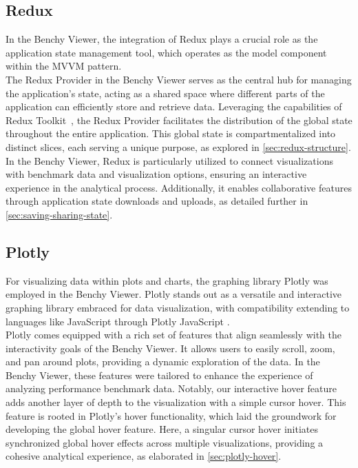\subsection{Redux}\label{sec:redux}

In the Benchy Viewer, the integration of Redux \parencite*{Redux} plays a crucial role as the application state management tool, which operates as the model component within the MVVM pattern.\\ 
The Redux Provider in the Benchy Viewer serves as the central hub for managing the application's state, acting as a shared space where different parts of the application can efficiently store and retrieve data. Leveraging the capabilities of Redux Toolkit~\parencite{redux-toolkit}, the Redux Provider facilitates the distribution of the global state throughout the entire application. This global state is compartmentalized into distinct slices, each serving a unique purpose, as explored in \ref{sec:redux-structure}.\\
In the Benchy Viewer, Redux is particularly utilized to connect visualizations with benchmark data and visualization options, ensuring an interactive experience in the analytical process. Additionally, it enables collaborative features through application state downloads and uploads, as detailed further in \ref*{sec:saving-sharing-state}.

\subsection{Plotly}

For visualizing data within plots and charts, the graphing library Plotly \parencite{plotly} was employed in the Benchy Viewer. Plotly stands out as a versatile and interactive graphing library embraced for data visualization, with compatibility extending to languages like JavaScript through Plotly JavaScript \parencite{plotly-js}.\\
Plotly comes equipped with a rich set of features that align seamlessly with the interactivity goals of the Benchy Viewer. It allows users to easily scroll, zoom, and pan around plots, providing a dynamic exploration of the data. In the Benchy Viewer, these features were tailored to enhance the experience of analyzing performance benchmark data. Notably, our interactive hover feature adds another layer of depth to the visualization with a simple cursor hover. This feature is rooted in Plotly's hover functionality, which laid the groundwork for developing the global hover feature. Here, a singular cursor hover initiates synchronized global hover effects across multiple visualizations, providing a cohesive analytical experience, as elaborated in \ref{sec:plotly-hover}. 

